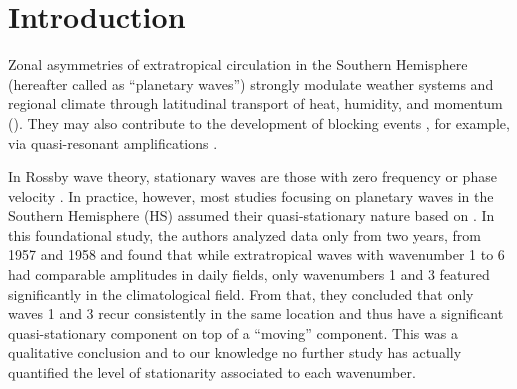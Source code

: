 \documentclass[draft,linenumbers]{agujournal2018}
\begin{document}
\vskip18pt
\section{Introduction}

Zonal asymmetries of extratropical circulation in the Southern
Hemisphere (hereafter called as ``planetary waves'') strongly modulate
weather systems and regional climate through latitudinal transport of
heat, humidity, and momentum (\citet{trenberth1980a}). They may also
contribute to the development of blocking events
\citep[e.g.~][]{trenberth1985}, for example, via quasi-resonant
amplifications \citep{petoukhov2013}.

In Rossby wave theory, stationary waves are those with zero frequency or
phase velocity \citep{holton2012}. In practice, however, most studies
focusing on planetary waves in the Southern Hemisphere (HS) assumed
their quasi-stationary nature based on \citet{vanloon1972}. In this
foundational study, the authors analyzed data only from two years, from
1957 and 1958 and found that while extratropical waves with wavenumber 1
to 6 had comparable amplitudes in daily fields, only wavenumbers 1 and 3
featured significantly in the climatological field. From that, they
concluded that only waves 1 and 3 recur consistently in the same
location and thus have a significant quasi-stationary component on top
of a ``moving'' component. This was a qualitative conclusion and to our
knowledge no further study has actually quantified the level of
stationarity associated to each wavenumber.
\end{document}
